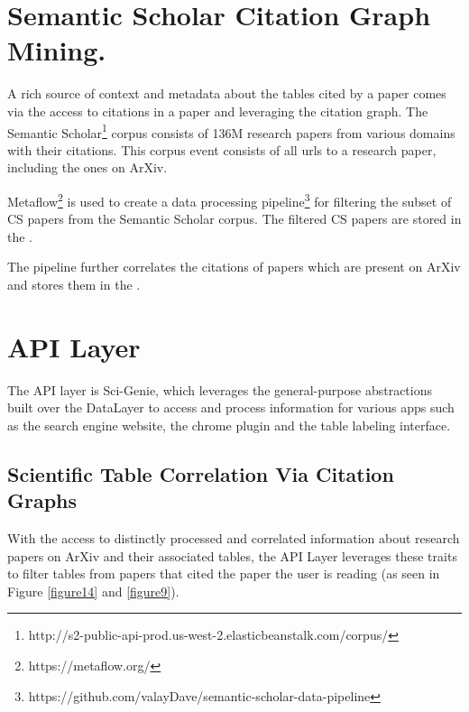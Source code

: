 \section{Semantic Scholar Citation Graph Mining.}
\label{sci-genie-core:citation-mining}
A rich source of context and metadata about the tables cited by a paper comes via the access to citations in a paper and leveraging the citation graph. The Semantic Scholar\footnote{http://s2-public-api-prod.us-west-2.elasticbeanstalk.com/corpus/} corpus consists of 136M research papers from various domains with their citations. This corpus event consists of all urls to a research paper, including the ones on ArXiv.  

Metaflow\footnote{https://metaflow.org/} is used to create a data processing pipeline\footnote{https://github.com/valayDave/semantic-scholar-data-pipeline} for filtering the subset of CS papers from the Semantic Scholar corpus. The filtered CS papers are stored in the . 

The pipeline further correlates the citations of papers which are present on ArXiv and stores them in the . 

\section{API Layer}
The API layer is Sci-Genie, which leverages the general-purpose abstractions built over the DataLayer to access and process information for various apps such as the search engine website, the chrome plugin and the table labeling interface. 

\subsection{Scientific Table Correlation Via Citation Graphs}
With the access to distinctly processed and correlated information about research papers on ArXiv and their associated tables, the API Layer leverages these traits to filter tables from papers that cited the paper the user is reading (as seen in Figure \ref{figure14} and \ref{figure9}). 


